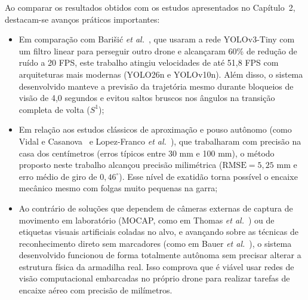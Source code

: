 Ao comparar os resultados obtidos com os estudos apresentados no Capítulo~2, destacam-se avanços práticos importantes:
\begin{itemize}
	\item Em comparação com Bari\v{s}i\'c \textit{et al.}~\cite{barisic2019}, que usaram a rede YOLOv3-Tiny com um filtro linear para perseguir outro drone e alcançaram 60\% de redução de ruído a 20 FPS, este trabalho atingiu velocidades de até 51,8 FPS com arquiteturas mais modernas (YOLO26n e YOLOv10n). Além disso, o sistema desenvolvido manteve a previsão da trajetória mesmo durante bloqueios de visão de 4,0 segundos e evitou saltos bruscos nos ângulos na transição completa de volta ($S^1$);
	\item Em relação aos estudos clássicos de aproximação e pouso autônomo (como Vidal e Casanova~\cite{vidal2007} e Lopez-Franco \textit{et al.}~\cite{lopezfranco2017}), que trabalharam com precisão na casa dos centímetros (erros típicos entre 30 mm e 100 mm), o método proposto neste trabalho alcançou precisão milimétrica ($\text{RMSE} = 5,25\text{ mm}$ e erro médio de giro de $0,46^\circ$). Esse nível de exatidão torna possível o encaixe mecânico mesmo com folgas muito pequenas na garra;
	\item Ao contrário de soluções que dependem de câmeras externas de captura de movimento em laboratório (MOCAP, como em Thomas \textit{et al.}~\cite{thomas2014}) ou de etiquetas visuais artificiais coladas no alvo, e avançando sobre as técnicas de reconhecimento direto sem marcadores (como em Bauer \textit{et al.}~\cite{bauer2023}), o sistema desenvolvido funcionou de forma totalmente autônoma sem precisar alterar a estrutura física da armadilha real. Isso comprova que é viável usar redes de visão computacional embarcadas no próprio drone para realizar tarefas de encaixe aéreo com precisão de milímetros.
\end{itemize}